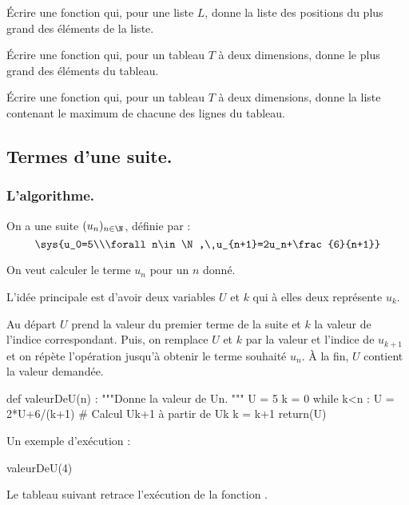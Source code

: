\documentclass[french,11pt,twoside]{VcCours}
\begin{document}
\begin{Exercice}{}
Écrire une fonction  qui, pour une liste $L$,
donne la liste des positions du plus grand des éléments de la liste.
\end{Exercice}

\begin{Exercice}{}
Écrire une fonction  qui, pour un
tableau $T$ à deux dimensions, donne le plus grand des éléments du tableau.
\end{Exercice}

\begin{Exercice}{}
Écrire une fonction  qui, pour un
tableau $T$ à deux dimensions, donne la liste contenant le maximum de chacune
des lignes du tableau.
\end{Exercice}

\newpage
\subsection{Termes d'une suite.}
\subsubsection{L'algorithme.}
On a une suite $(u_n)_{n\in\N}$, définie par :
\[\sys{u_0=5\\\forall n\in\N,\ u_{n+1}=2u_n+\frac{6}{n+1}}\]

On veut calculer le terme $u_n$ pour un $n$ donné.

L'idée principale est d'avoir deux variables $U$ et $k$ qui à elles deux
représente $u_k$.

Au départ $U$ prend la valeur du premier terme de la suite et $k$ la valeur de
l'indice correspondant. Puis, on remplace $U$ et $k$ par la valeur et l'indice
de $u_{k+1}$ et on répète l'opération jusqu'à obtenir le terme souhaité $u_n$.
À la fin, $U$ contient la valeur demandée.

\begin{Python}
def valeurDeU(n) :
    """Donne la valeur de Un.
    """
    U = 5
    k = 0
    while k<n :
        U = 2*U+6/(k+1) # Calcul Uk+1 à partir de Uk
        k = k+1
    return(U)
\end{Python}

Un exemple d'exécution :
\begin{Python*}
valeurDeU(4)
\end{Python*}

Le tableau suivant retrace l'exécution de la fonction .
\end{document}
